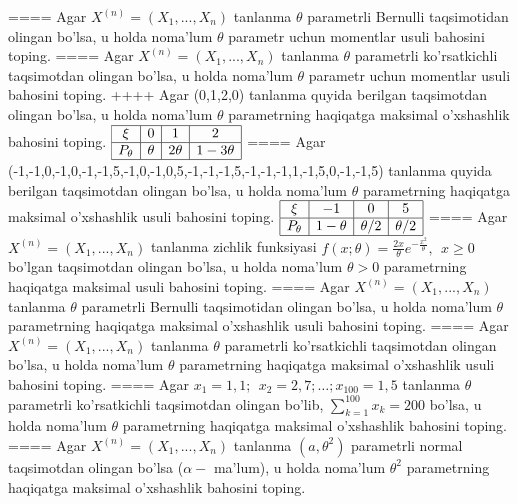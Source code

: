 ====
Agar \(X^{(n)} = \left( X_{1},...,X_{n} \right)\) tanlanma \(\theta\) parametrli Bernulli taqsimotidan olingan bo'lsa, u holda noma'lum \(\theta\) parametr uchun momentlar usuli bahosini toping.
====
Agar \(X^{(n)} = \left( X_{1},...,X_{n} \right)\) tanlanma \(\theta\) parametrli ko'rsatkichli taqsimotdan olingan bo'lsa, u holda noma'lum \(\theta\) parametr uchun momentlar usuli bahosini toping.
++++
Agar (0,1,2,0) tanlanma quyida berilgan taqsimotdan olingan bo'lsa, u holda noma'lum \(\theta\) parametrning haqiqatga maksimal o'xshashlik bahosini toping.
$\begin{array}{|c|c|c|c|}
    \hline
    \xi & 0 & 1 & 2 \\
    \hline
    P_{\theta} & \theta & 2\theta & 1 - 3\theta \\
    \hline
\end{array}$
====
Agar (-1,-1,0,-1,0,-1,-1,5,-1,0,-1,0,5,-1,-1,-1,5,-1,-1,-1,1,-1,5,0,-1,-1,5) tanlanma quyida berilgan taqsimotdan olingan bo'lsa, u holda noma'lum \(\theta\) parametrning haqiqatga maksimal o'xshashlik usuli bahosini toping.
$\begin{array}{|c|c|c|c|}
    \hline
    \xi & - 1 & 0 & 5\\
    \hline
    P_{\theta} & 1 - \theta & \theta/2 & \theta/2 \\
    \hline
\end{array}$
====
Agar \(X^{(n)} = \left( X_{1},...,X_{n} \right)\) tanlanma zichlik funksiyasi \(f(x;\theta) = \frac{2x}{\theta}e^{- \frac{x^{2}}{\theta}},\ \ x \geq 0\) bo'lgan taqsimotdan olingan bo'lsa, u holda noma'lum \(\theta > 0\) parametrning haqiqatga maksimal usuli bahosini toping.
====
Agar \(X^{(n)} = \left( X_{1},...,X_{n} \right)\) tanlanma \(\theta\) parametrli Bernulli taqsimotidan olingan bo'lsa, u holda noma'lum \(\theta\) parametrning haqiqatga maksimal o'xshashlik usuli bahosini toping.
====
Agar \(X^{(n)} = \left( X_{1},...,X_{n} \right)\) tanlanma \(\theta\) parametrli ko'rsatkichli taqsimotdan olingan bo'lsa, u holda noma'lum \(\theta\) parametrning haqiqatga maksimal o'xshashlik usuli bahosini toping.
====
Agar \(x_{1} = 1,1;\ \ x_{2} = 2,7;\ldots;x_{100} = 1,5\) tanlanma \(\theta\) parametrli ko'rsatkichli taqsimotdan olingan bo'lib, \(\sum_{k = 1}^{100}x_{k} = 200\) bo'lsa, u holda noma'lum \(\theta\) parametrning haqiqatga maksimal o'xshashlik bahosini toping.
====
Agar \(X^{(n)} = \left( X_{1},...,X_{n} \right)\) tanlanma \(\left( a,\theta^{2} \right)\) parametrli normal taqsimotdan olingan bo'lsa (\(\alpha -\) ma'lum), u holda noma'lum \(\theta^{2}\) parametrning haqiqatga maksimal o'xshashlik bahosini toping.
